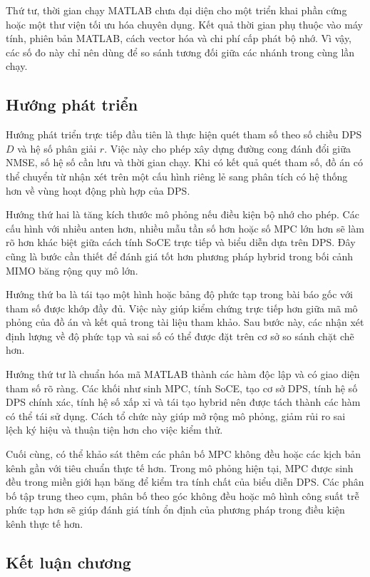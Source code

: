 Thứ tư, thời gian chạy MATLAB chưa đại diện cho một triển khai phần cứng hoặc một thư viện tối ưu hóa chuyên dụng. Kết quả thời gian phụ thuộc vào máy tính, phiên bản MATLAB, cách vector hóa và chi phí cấp phát bộ nhớ. Vì vậy, các số đo này chỉ nên dùng để so sánh tương đối giữa các nhánh trong cùng lần chạy.

\subsection{Hướng phát triển}
\label{subsec:ch5_future_work}

Hướng phát triển trực tiếp đầu tiên là thực hiện quét tham số theo số chiều DPS \(D\) và hệ số phân giải \(r\). Việc này cho phép xây dựng đường cong đánh đổi giữa NMSE, số hệ số cần lưu và thời gian chạy. Khi có kết quả quét tham số, đồ án có thể chuyển từ nhận xét trên một cấu hình riêng lẻ sang phân tích có hệ thống hơn về vùng hoạt động phù hợp của DPS.

Hướng thứ hai là tăng kích thước mô phỏng nếu điều kiện bộ nhớ cho phép. Các cấu hình với nhiều anten hơn, nhiều mẫu tần số hơn hoặc số MPC lớn hơn sẽ làm rõ hơn khác biệt giữa cách tính SoCE trực tiếp và biểu diễn dựa trên DPS. Đây cũng là bước cần thiết để đánh giá tốt hơn phương pháp hybrid trong bối cảnh MIMO băng rộng quy mô lớn.

Hướng thứ ba là tái tạo một hình hoặc bảng độ phức tạp trong bài báo gốc với tham số được khớp đầy đủ. Việc này giúp kiểm chứng trực tiếp hơn giữa mã mô phỏng của đồ án và kết quả trong tài liệu tham khảo. Sau bước này, các nhận xét định lượng về độ phức tạp và sai số có thể được đặt trên cơ sở so sánh chặt chẽ hơn.

Hướng thứ tư là chuẩn hóa mã MATLAB thành các hàm độc lập và có giao diện tham số rõ ràng. Các khối như sinh MPC, tính SoCE, tạo cơ sở DPS, tính hệ số DPS chính xác, tính hệ số xấp xỉ và tái tạo hybrid nên được tách thành các hàm có thể tái sử dụng. Cách tổ chức này giúp mở rộng mô phỏng, giảm rủi ro sai lệch ký hiệu và thuận tiện hơn cho việc kiểm thử.

Cuối cùng, có thể khảo sát thêm các phân bố MPC không đều hoặc các kịch bản kênh gần với tiêu chuẩn thực tế hơn. Trong mô phỏng hiện tại, MPC được sinh đều trong miền giới hạn băng để kiểm tra tính chất của biểu diễn DPS. Các phân bố tập trung theo cụm, phân bố theo góc không đều hoặc mô hình công suất trễ phức tạp hơn sẽ giúp đánh giá tính ổn định của phương pháp trong điều kiện kênh thực tế hơn.

\subsection{Kết luận chương}
\label{subsec:ch5_conclusion}

